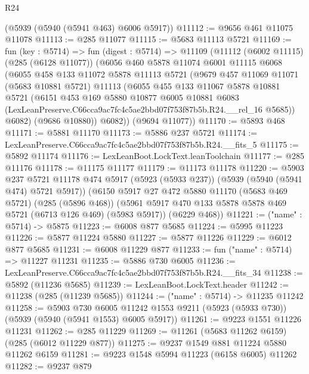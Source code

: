\begin{lexlean}{R24}
\begin{coremodule}
    (@5939 (@5940 (@5941 @463) @6006 @5917))
@11112 := @9656 @461 @11075 @11078
@11113 := @285 @11077
@11115 := @5683 @11113 @5721
@11169 := fun (key : @5714) =>
  fun (digest : @5714) =>
  @11109
    (@11112
      (@6002 @11115)
      (@285 (@6128 @11077))
      (@6056
        @460
        @5878
        @11074
        @6001
        @11115
        @6068
        (@6055
          @458
          @133
          @11072
          @5878
          @11113
          @5721
          (@9679
            @457
            @11069
            @11071
            (@5683 @10881 @5721)
            @11113
            (@6055
              @455
              @133
              @11067
              @5878
              @10881
              @5721
              (@6151
                @453
                @169
                @5880
                @10877
                @6005
                @10881
                @6083
                (LexLeanPreserve.C66cca9ac7fc4c5ae2bbd07f753f87b5b.R24.__rel_16 @5685))
              @6082)
            (@9686 @10880))
          @6082))
      (@9694 @11077))
@11170 := @5893 @468
@11171 := @5881 @11170
@11173 := @5886 @237 @5721
@11174 := LexLeanPreserve.C66cca9ac7fc4c5ae2bbd07f753f87b5b.R24.__fits_5
@11175 := @5892 @11174
@11176 := LexLeanBoot.LockText.leanToolchain
@11177 := @285 @11176
@11178 := @11175 @11177
@11179 := @11173 @11178
@11220 := @5903
    @237
    @5721
    @11178
    @474
    @5917
    (@5923 (@5933 @237))
    (@5939 (@5940 (@5941 @474) @5721 @5917))
    (@6150
      @5917
      @27
      @472
      @5880
      @11170
      (@5683 @469 @5721)
      (@285 (@5896 @468))
      (@5961 @5917 @470 @133 @5878 @5878 @469 @5721 (@6713 @126 @469) (@5983 @5917))
      (@6229 @468))
@11221 := ("name" : @5714) -> @5875
@11223 := @6008 @877 @5685
@11224 := @5995 @11223
@11226 := @5877 @11224 @5880
@11227 := @5877 @11226
@11229 := @6012 @877 @5685
@11231 := @6008 @11229 @877
@11233 := fun ("name" : @5714) => @11227 @11231
@11235 := @5886 @730 @6005
@11236 := LexLeanPreserve.C66cca9ac7fc4c5ae2bbd07f753f87b5b.R24.__fits_34
@11238 := @5892 (@11236 @5685)
@11239 := LexLeanBoot.LockText.header
@11242 := @11238 (@285 (@11239 @5685))
@11244 := ("name" : @5714) -> @11235 @11242
@11258 := @5903
    @730
    @6005
    @11242
    @1553
    @9211
    (@5923 (@5933 @730))
    (@5939 (@5940 (@5941 @1553) @6005 @5917))
@11261 := @9223 @1551 @11226 @11231
@11262 := @285 @11229
@11269 := @11261 (@5683 @11262 @6159) (@285 (@6012 @11229 @877))
@11275 := @9237 @1549 @881 @11224 @5880 @11262 @6159
@11281 := @9223 @1548 @5994 @11223 (@6158 @6005) @11262
@11282 := @9237 @879

\end{coremodule}
\end{lexlean}

